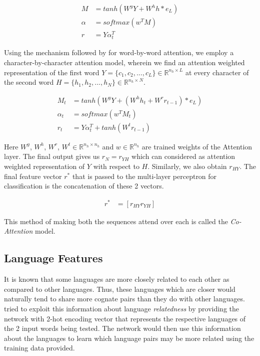 \documentclass[11pt,letterpaper]{article}
\begin{document}
\begin{align}
M &= tanh(W^yY + W^hh*e_L) \\
\alpha &= softmax(w^TM) \\
r &= Y\alpha_t^T
\end{align}

Using the mechanism followed by \citet{rocktaschel2016reasoning} for word-by-word attention, we employ a character-by-character attention model, wherein we find an attention weighted representation of the first word $Y = \{c_1, c_2, ..., c_L\} \in \mathbb{R}^{n_h \times L}$ at every character of the second word $H = \{h_1, h_2, ..., h_N\} \in \mathbb{R}^{n_h \times N}$.

\begin{align}
M_t &= tanh(W^yY + (W^hh_t + W^rr_{t-1})*e_L) \\
\alpha_t &= softmax(w^TM_t) \\
r_t &= Y\alpha_t^T + tanh(W^tr_{t-1})
\end{align}

Here $W^y$, $W^h$, $W^r$, $W^t \in  \mathbb{R}^{n_h \times n_h}$ and $w \in \mathbb{R}^{n_h}$ are trained weights of the Attention layer. The final output gives us $r_N = r_{YH}$ which can considered as attention weighted representation of $Y$ with respect to $H$. Similarly, we also obtain $r_{HY}$. The final feature vector $r^*$ that is passed to the multi-layer perceptron for classification is the concatenation of these 2 vectors.

\begin{align}
r^* &= [r_{HY} r_{YH}]
\end{align}

 This method of making both the sequences attend over each is called the \textit{Co-Attention} model.
 
\subsection{Language Features}

It is known that some languages are more closely related to each other as compared to other languages. Thus, these languages which are closer would naturally tend to share more cognate pairs than they do with other languages. \citet{rama2016siamese} tried to exploit this information about language \textit{relatedness} by providing the network with 2-hot encoding vector that represents the respective languages of the 2 input words being tested. The network would then use this information about the languages to learn which language pairs may be more related using the training data provided.
\end{document}
